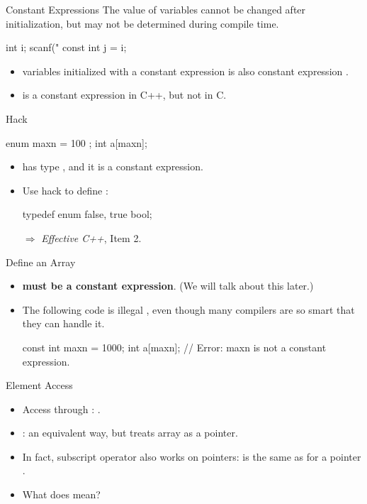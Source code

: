 \documentclass{beamer}
\begin{document}
\begin{frame}[fragile]{Constant Expressions}
	The value of  variables cannot be changed after initialization, but may not be determined during compile time.
	\begin{cpp}
int i;
scanf("%
const int j = i;
	\end{cpp}
	\pause
	\begin{itemize}
		\item {} variables initialized with a constant expression is also constant expression .
		\item {} is a constant expression in C++, but not in C.
	\end{itemize}
\end{frame}

\begin{frame}[fragile]{ Hack}
	\begin{cpp}
enum { maxn = 100 };
int a[maxn];
	\end{cpp}
	\begin{itemize}
		\item {} has type , and it is a constant expression.
		\pause
		\item Use  hack to define :
		\begin{cpp}
typedef enum { false, true } bool;
		\end{cpp}
		\item[\(\Rightarrow\)] \textit{Effective C++}, Item 2.
	\end{itemize}
\end{frame}

\begin{frame}[fragile]{Define an Array}
	\begin{itemize}
		\item {} \textbf{must be a constant expression}. (We will talk about this later.)
		\item The following code is illegal , even though many compilers are so smart that they can handle it.
		\begin{cpp}
const int maxn = 1000;
int a[maxn]; // Error: maxn is not a constant expression.
		\end{cpp}
	\end{itemize}
\end{frame}

\begin{frame}{Element Access}
	\begin{itemize}
		\item Access through : .
		\pause
		\item {}: an equivalent way, but treats array as a pointer.
		\item In fact, subscript operator also works on pointers:  is the same as  for a pointer .
		\pause
		\item What does  mean?\\
		\pause
	\end{itemize}
\end{frame}
\end{document}
